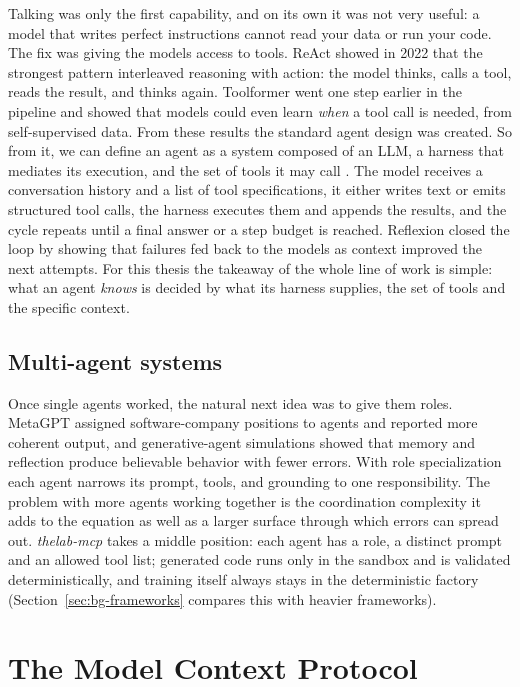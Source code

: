 Talking was only the first capability, and on its own it was not very useful: a model that writes perfect instructions cannot read your data or run your code. The fix was giving the models access to tools. ReAct \cite{yao2023react} showed in 2022 that the strongest pattern interleaved reasoning with action: the model thinks, calls a tool, reads the result, and thinks again. Toolformer \cite{schick2023toolformer} went one step earlier in the pipeline and showed that models could even learn \emph{when} a tool call is needed, from self-supervised data. From these results the standard agent design was created. So from it, we can define an agent as a system composed of an LLM, a harness that mediates its execution, and the set of tools it may call \cite{sutton2019bitter}. The model receives a conversation history and a list of tool specifications, it either writes text or emits structured tool calls, the harness executes them and appends the results, and the cycle repeats until a final answer or a step budget is reached. Reflexion \cite{shinn2023reflexion} closed the loop by showing that failures fed back to the models as context improved the next attempts. For this thesis the takeaway of the whole line of work is simple: what an agent \emph{knows} is decided by what its harness supplies, the set of tools and the specific context.

\subsection{Multi-agent systems}

Once single agents worked, the natural next idea was to give them roles. MetaGPT \cite{hong2023metagpt} assigned software-company positions to agents and reported more coherent output, and generative-agent simulations \cite{park2023generative} showed that memory and reflection produce believable behavior with fewer errors. With role specialization each agent narrows its prompt, tools, and grounding to one responsibility. The problem with more agents working together is the coordination complexity it adds to the equation as well as a larger surface through which errors can spread out. \emph{thelab-mcp} takes a middle position: each agent has a role, a distinct prompt and an allowed tool list; generated code runs only in the sandbox and is validated deterministically, and training itself always stays in the deterministic factory (Section~\ref{sec:bg-frameworks} compares this with heavier frameworks).

\section{The Model Context Protocol}
\label{sec:bg-mcp}

